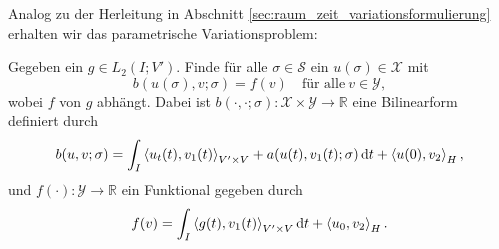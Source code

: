 Analog zu der Herleitung in Abschnitt \ref{sec:raum_zeit_variationsformulierung} erhalten wir das parametrische Variationsproblem:

Gegeben ein $g \in L_{2}(I; V')$. Finde für alle $\sigma \in \mathcal S$ ein $u(\sigma) \in \mathcal X$ mit
\begin{equation}
    \label{eq:var_all_problem_parametrisch}
    b(u(\sigma), v; \sigma) = f(v) \quad \text{für alle}~v \in \mathcal Y,
\end{equation}
wobei $f$ von $g$ abhängt.
Dabei ist $b(\cdot, \cdot; \sigma) \colon \mathcal X \times \mathcal Y \to \mathbb{R}$ eine Bilinearform definiert durch
\begin{equation}
    \label{eq:var_all_bf_b_parametrisch}
    b(u, v; \sigma) = \int_{I} \left\langle u_{t}(t),v_{1}(t)\right\rangle_{V' \times V} + a(u(t), v_{1}(t); \sigma) \mathop{}\!\mathrm{d} t + \left\langle u(0),v_{2}\right\rangle_{H},
\end{equation}
und $f(\cdot) \colon \mathcal Y \to \mathbb{R}$ ein Funktional gegeben durch
\begin{equation}
    \label{eq:var_all_f_parametrisch}
    f(v) = \int_{I} \left\langle g(t),v_{1}(t)\right\rangle_{V' \times V} \mathop{}\!\mathrm{d} t + \left\langle u_{0},v_{2}\right\rangle_{H}.
\end{equation}

